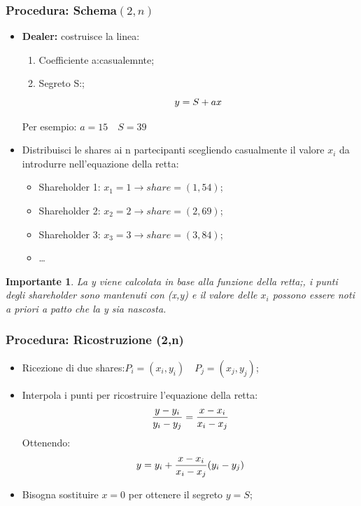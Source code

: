 \documentclass{book}
\newtheorem*{Importante}{\textbf{Importante}}
\theoremstyle{definition}
\begin{document}
\subsubsection{Procedura: Schema\((2,n)\)}
\begin{itemize}
    \item \textbf{Dealer:} costruisce la linea:
          \begin{enumerate}
              \item Coefficiente a:\@scelto casualemnte;
              \item Segreto S:\@noto;
                    \begin{equation*}
                        \centering
                        y=S+ax
                    \end{equation*}
          \end{enumerate}
          Per esempio: \(a=15\quad S=39\)
    \item Distribuisci le shares ai n partecipanti scegliendo casualmente il valore \(x_{i}\) da introdurre nell'equazione della retta:
          \begin{itemize}
              \item Shareholder 1: \(x_{1}=1\rightarrow share=(1,54)\);
              \item Shareholder 2: \(x_{2}=2\rightarrow share=(2,69)\);
              \item Shareholder 3: \(x_{3}=3\rightarrow share=(3,84)\);
              \item \dots
          \end{itemize}
\end{itemize}
\begin{Importante}
    La y viene calcolata in base alla funzione della retta;\@tuttavia, i punti degli shareholder sono mantenuti con (x,y) e il valore delle \(x_{i}\) possono essere noti a priori a patto che la y sia nascosta\@.
\end{Importante}
\subsubsection{Procedura: Ricostruzione (2,n)}
\begin{itemize}
    \item Ricezione di due shares:\(P_{i}=(x_{i},y_{i})\quad P_{j}=(x_{j},y_{j})\);
    \item Interpola i punti per ricostruire l'equazione della retta:
          \begin{equation*}
              \centering
              \frac{y-y_{i}}{y_{i}-y_{j}}=\frac{x-x_{i}}{x_{i}-x_{j}}
          \end{equation*}
          Ottenendo:
          \begin{equation*}
              \centering
              y=y_{i}+\frac{x-x_{i}}{x_{i}-x_{j}}(y_{i}-y_{j})
          \end{equation*}
    \item Bisogna sostituire \(x=0\) per ottenere il segreto \(y=S\);
\end{itemize}
\end{document}
